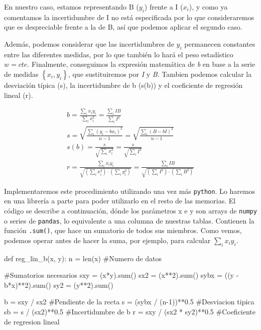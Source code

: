 \documentclass[12pt, a4paper, titlepage]{article}
\newcommand{\code}[1]{\texttt{#1}} %
\begin{document}
\begin{appendices}
    En nuestro caso, estamos representando B ($y_i$) frente a I ($x_i$), y como ya comentamos la incertidumbre de I no está especificada por lo que consideraremos que es despreciable frente a la de B, así que podemos aplicar el segundo caso.

    Además, podemos considerar que las incertidumbres de $y_i$ permanecen constantes entre las diferentes medidas, por lo que también lo hará el peso estadístico $w = cte$. Finalmente, conseguimos la expresión matemática de \textit{b} en base a la serie de medidas $\left\{ x_i, y_i \right\}$, que sustituiremos por \textit{I} y \textit{B}. Tambien podemos calcular la desviación típica (s), la incertidumbre de b (s(b)) y el coeficiente de regresión lineal (r).

    \begin{gather}
      b = \frac{\sum_i{x_i y_i}}{\sum_i{x_i^2}} = \frac{\sum_i{I B}}{\sum_i{I^2}} \label{ec:regb} \\
      s = \sqrt{\frac{\sum_i{(y_i - bx_i)^2}}{n - 1}} = \sqrt{\frac{\sum_i{(B - bI)^2}}{n - 1}} \label{ec:regs} \\
      s(b) = \frac{s}{\sqrt{\sum_i{x_i^2}}} = \frac{s}{\sqrt{\sum_i{I^2}}} \label{ec:regsb} \\
      r = \frac{\sum_i{x_i y_i}}{\sqrt{(\sum_i{x_i^2}) \cdot (\sum_i{y_i^2})}} = \frac{\sum_i{I B}}{\sqrt{(\sum_i{I^2}) \cdot (\sum_i{B^2})}} \label{ec:regr}
    \end{gather}

    Implementaremos este procedimiento utilizando una vez más \code{python}. Lo haremos en una librería a parte para poder utilizarlo en el resto de las memorias. El código se describe a continuación, dónde los parámetros x e y son arrays de \code{numpy} o series de \code{pandas}, lo equivalente a una columna de nuestras tablas. Contienen la función \code{.sum()}, que hace un sumatorio de todos sus miembros. Como vemos, podemos operar antes de hacer la suma, por ejemplo, para calcular $\sum_i{x_i y_i}$.

    \begin{python}
      def reg_lin_b(x, y):
          n = len(x) #Numero de datos

          #Sumatorios necesarios
          sxy = (x*y).sum()
          sx2 = (x**2).sum()
          sybx = ((y - b*x)**2).sum()
          sy2 = (y**2).sum()

          b = sxy / sx2 #Pendiente de la recta
          s = (sybx / (n-1))**0.5 #Desviacion tipica
          sb = s / (sx2)**0.5 #Incertidumbre de b
          r = sxy / (sx2 * sy2)**0.5 #Coeficiente de regresion lineal


\end{python}
\end{appendices}
\end{document}
